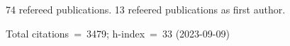 74 refereed publications. 13 refeered publications as first author.

Total citations~=~3479; h-index~=~33 (2023-09-09)